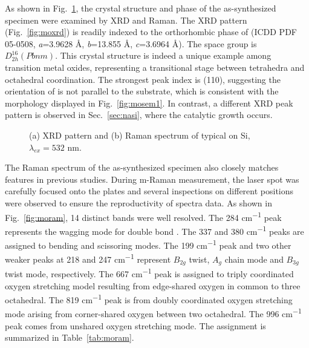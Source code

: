 As shown in Fig.~\ref{fig:mooxch}, the crystal structure and phase of the as-synthesized specimen were examined by XRD and Raman. The XRD pattern (Fig.~\ref{fig:moxrd}) is readily indexed to the orthorhombic phase of  (ICDD PDF 05-0508, \emph{a}=3.9628 \AA, \emph{b}=13.855 \AA, \emph{c}=3.6964 \AA). The space group is $D_{2h}^{16}(Pbnm)$. This crystal structure is indeed a unique example among transition metal oxides, representing a transitional stage between tetrahedra and octahedral coordination.\cite{Itoh2001a} The strongest peak index is (110), suggesting the orientation of  is not parallel to the substrate, which is consistent with the morphology displayed in Fig.~\ref{fig:mosem1}. In contrast, a different XRD peak pattern is observed in Sec.~\ref{sec:nasi}, where the catalytic growth occurs.
\begin{figure}[htb]
\centering
{}\hspace{0.04\textwidth}
\caption[Crystalline phase characterization of  on Si]{(a) XRD pattern and (b) Raman spectrum of typical  on Si, $\lambda_{ex} = 532$ nm.}
\label{fig:mooxch}
\end{figure}
The Raman spectrum of the as-synthesized specimen also closely matches  features in previous studies.\cite{Dixit1986,Silveira2012} During m-Raman measurement, the laser spot was carefully focused onto the plates and several inspections on different positions were observed to ensure the reproductivity of spectra data. As shown in Fig.~\ref{fig:moram}, 14 distinct bands were well resolved. The 284 \si{cm^{-1}} peak represents the wagging mode for double bond . The 337 and 380  \si{cm^{-1}} peaks are assigned to  bending and scissoring modes. The 199 \si{cm^{-1}} peak and two other weaker peaks at 218 and 247 \si{cm^{-1}} represent  $B_{2g}$ twist, $A_g$ chain mode and  $B_{3g}$ twist mode, respectively. The 667 \si{cm^{-1}} peak is assigned to triply coordinated oxygen stretching model resulting from edge-shared oxygen in common to three octahedral. The 819 \si{cm^{-1}} peak is from doubly coordinated oxygen stretching mode arising from corner-shared oxygen between two octahedral. The 996 \si{cm^{-1}} peak comes from unshared oxygen stretching mode.\cite{Siciliano2009} The assignment is summarized in Table~\ref{tab:moram}.

